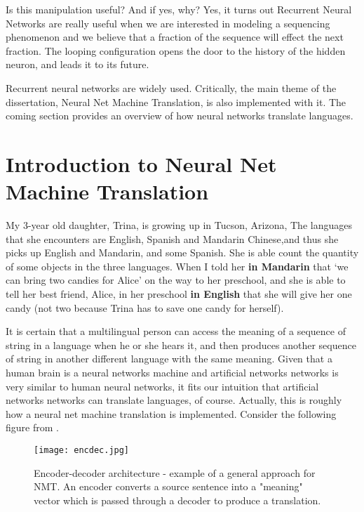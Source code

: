 Is this manipulation useful? And if yes, why? Yes, it turns out Recurrent Neural Networks are really useful when we are interested in modeling a sequencing phenomenon and we believe that a fraction of the sequence will effect the next fraction. The looping configuration opens the door to the history of the hidden neuron, and leads it to its future. 

Recurrent neural networks are widely used. Critically, the main theme of the dissertation, Neural Net Machine Translation, is also implemented with it. The coming section provides an overview of how neural networks translate languages. 

\newpage
\section{Introduction to Neural Net Machine Translation}

My 3-year old daughter, Trina, is growing up in Tucson, Arizona, The languages that she encounters are English, Spanish and Mandarin Chinese,and thus she picks up English and Mandarin, and some Spanish. She is able count the quantity of some objects in the three languages. When I told her \textbf{in  Mandarin} that `we can bring two candies for Alice' on the way to her preschool, and she is able to tell her best friend, Alice, in her preschool \textbf{in English} that she will give her one candy (not two because Trina has to save one candy for herself).         

It is certain that a multilingual person can access the meaning of a sequence of string in a language when he or she hears it, and then produces another sequence of string in another different language with the same meaning. Given that a human brain is a neural networks machine and artificial networks networks is very similar to human neural networks, it fits our intuition that artificial networks networks can translate languages, of course. Actually, this is roughly how a neural net machine translation is implemented. Consider the following figure from \citet{luong17GitHub}.

\begin{figure}[h]
\caption{Encoder-decoder architecture - example of a general approach for NMT. An encoder converts a source sentence into a "meaning" vector which is passed through a decoder to produce a translation. \citep{luong17GitHub}}
\centering
\texttt{[image: encdec.jpg]}
\end{figure} 


